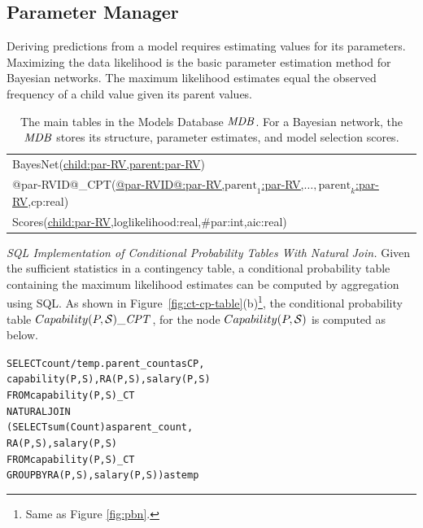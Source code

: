 \documentclass{sfuthesis}
\begin{document}


\subsection{Parameter Manager} \label{sec:parameters}
Deriving predictions from a model requires estimating values for its parameters.  Maximizing the data likelihood is the basic parameter estimation method for Bayesian networks. The maximum likelihood estimates equal the observed frequency of a child value given its parent values.


\begin{table}[!h]
\caption{The main tables in the Models Database $\MDB$. For a Bayesian network, the $\MDB$ stores its structure, parameter estimates, and model selection scores.}
 \centering
 \begin{tabular}
[c]{|l|}\hline
BayesNet(\underline{child:par-RV,parent:par-RV})\\
@par-RVID@\_CPT(\underline{@par-RVID@:par-RV,$\mbox{parent}_{1}$:par-RV,$\ldots,\mbox{parent}_{k}$:par-RV},cp:real)\\ 
Scores(\underline{child:par-RV},loglikelihood:real,\#par:int,aic:real)\\
\hline
\end{tabular}
\label{table:mdb-schema}
\end{table}
{\em SQL Implementation of Conditional Probability Tables With Natural Join.} Given the sufficient statistics in a contingency table, a conditional probability table containing the maximum likelihood estimates can be computed by aggregation using SQL.  As shown in Figure~\ref{fig:ct-cp-table}(b)\footnote{Same as Figure \ref{fig:pbn}.}, the conditional probability table $Capability(\P,\S)\_\cptable$, for the node $Capability(\P,\S)$ is computed as below. 
\begin{alltt}
SELECT count/temp.parent\_count as CP, 
capability(P,S), RA(P,S), salary(P,S) 
FROM capability(P,S)\_CT 
	NATURAL JOIN  
(SELECT sum(Count) as parent\_count, 
RA(P,S), salary(P,S) 
FROM capability(P,S)\_CT  
GROUP BY  RA(P,S), salary(P,S) ) as temp
\end{alltt}
\end{document}
